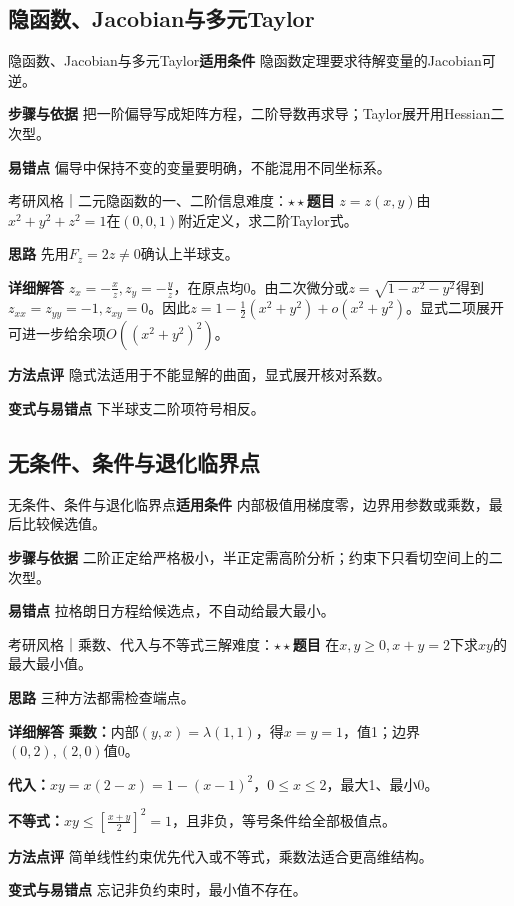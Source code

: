 \subsection{隐函数、Jacobian与多元Taylor}\label{deep:multivariable_source_deep:implicitmany}

\begin{method}{隐函数、Jacobian与多元Taylor}\textbf{适用条件} 隐函数定理要求待解变量的Jacobian可逆。\par\textbf{步骤与依据} 把一阶偏导写成矩阵方程，二阶导数再求导；Taylor展开用Hessian二次型。\par\textbf{易错点} 偏导中保持不变的变量要明确，不能混用不同坐标系。\end{method}

\begin{example}{考研风格｜二元隐函数的一、二阶信息}{难度：$\star\star$}\label{deep:ex:multivariable_source_deep:implicitmatrix}\textbf{题目} $z=z(x,y)$由$x^2+y^2+z^2=1$在$(0,0,1)$附近定义，求二阶Taylor式。\par\textbf{思路} 先用$F_z=2z\ne0$确认上半球支。\par\textbf{详细解答} $z_x=-\frac{x}{z},z_y=-\frac{y}{z}$，在原点均0。由二次微分或$z=\sqrt{1-x^2-y^2}$得到$z_{xx}=z_{yy}=-1,z_{xy}=0$。因此$z=1-\frac12(x^2+y^2)+o(x^2+y^2)$。显式二项展开可进一步给余项$O((x^2+y^2)^2)$。\par\textbf{方法点评} 隐式法适用于不能显解的曲面，显式展开核对系数。\par\textbf{变式与易错点} 下半球支二阶项符号相反。\end{example}

\subsection{无条件、条件与退化临界点}\label{deep:multivariable_source_deep:extrema}

\begin{method}{无条件、条件与退化临界点}\textbf{适用条件} 内部极值用梯度零，边界用参数或乘数，最后比较候选值。\par\textbf{步骤与依据} 二阶正定给严格极小，半正定需高阶分析；约束下只看切空间上的二次型。\par\textbf{易错点} 拉格朗日方程给候选点，不自动给最大最小。\end{method}

\begin{example}{考研风格｜乘数、代入与不等式三解}{难度：$\star\star$}\label{deep:ex:multivariable_source_deep:lagrange}\textbf{题目} 在$x,y\ge0,x+y=2$下求$xy$的最大最小值。\par\textbf{思路} 三种方法都需检查端点。\par\textbf{详细解答} \textbf{乘数：}内部$(y,x)=\lambda(1,1)$，得$x=y=1$，值1；边界$(0,2),(2,0)$值0。\par\textbf{代入：}$xy=x(2-x)=1-(x-1)^2$，$0\le x\le2$，最大1、最小0。\par\textbf{不等式：}$xy\le[\frac{x+y}{2}]^2=1$，且非负，等号条件给全部极值点。\par\textbf{方法点评} 简单线性约束优先代入或不等式，乘数法适合更高维结构。\par\textbf{变式与易错点} 忘记非负约束时，最小值不存在。\end{example}

